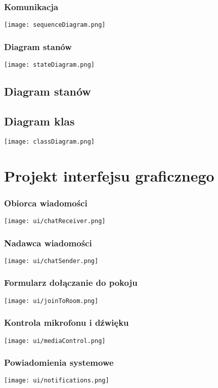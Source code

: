 \documentclass{article}
\begin{document}
\subsubsection{Komunikacja}
\texttt{[image: sequenceDiagram.png]}

\subsubsection{Diagram stanów}
\texttt{[image: stateDiagram.png]}

\subsection{Diagram stanów}

\subsection{Diagram klas}
\texttt{[image: classDiagram.png]}

\section{Projekt interfejsu graficznego}

\subsubsection{Obiorca wiadomości}
\texttt{[image: ui/chatReceiver.png]}

\subsubsection{Nadawca wiadomości}
\texttt{[image: ui/chatSender.png]}

\subsubsection{Formularz dołączanie do pokoju}
\texttt{[image: ui/joinToRoom.png]}

\subsubsection{Kontrola mikrofonu i dźwięku}
\texttt{[image: ui/mediaControl.png]}

\subsubsection{Powiadomienia systemowe}
\texttt{[image: ui/notifications.png]}
\end{document}
